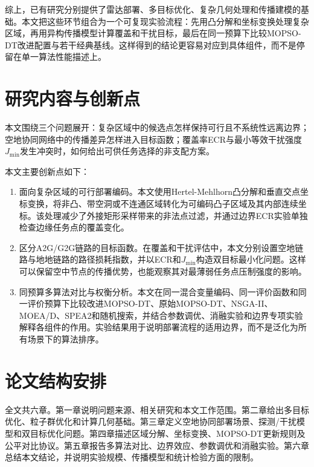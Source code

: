 综上，已有研究分别提供了雷达部署、多目标优化、复杂几何处理和传播建模的基础。本文把这些环节组合为一个可复现实验流程：先用凸分解和坐标变换处理复杂区域，再用异构传播模型计算覆盖和干扰目标，最后在同一预算下比较MOPSO-DT改进配置与若干经典基线。这样得到的结论更容易对应到具体组件，而不是停留在单一算法性能描述上。

\section{研究内容与创新点}

本文围绕三个问题展开：复杂区域中的候选点怎样保持可行且不系统性远离边界；空地协同网络中的传播差异怎样进入目标函数；覆盖率ECR与最小等效干扰强度$J_{\min}$发生冲突时，如何给出可供任务选择的非支配方案。

本文主要创新点如下：

\begin{enumerate}
    \item 面向复杂区域的可行部署编码。本文使用Hertel-Mehlhorn凸分解和垂直交点坐标变换，将非凸、带空洞或不连通区域转化为可编码凸子区域及其内部连续坐标。该处理减少了外接矩形采样带来的非法点过滤，并通过边界ECR实验单独检查边缘任务点的覆盖变化。
    \item 区分A2G/G2G链路的目标函数。在覆盖和干扰评估中，本文分别设置空地链路与地地链路的路径损耗指数，并以ECR和$J_{\min}$构造双目标最小化问题。这样可以保留空中节点的传播优势，也能观察其对最薄弱任务点压制强度的影响。
    \item 同预算多算法对比与权衡分析。本文在同一混合变量编码、同一评价函数和同一评价预算下比较改进MOPSO-DT、原始MOPSO-DT、NSGA-II、MOEA/D、SPEA2和随机搜索，并结合参数调优、消融实验和边界专项实验解释各组件的作用。实验结果用于说明部署流程的适用边界，而不是泛化为所有场景下的算法排序。
\end{enumerate}

\section{论文结构安排}

全文共六章。第一章说明问题来源、相关研究和本文工作范围。第二章给出多目标优化、粒子群优化和计算几何基础。第三章定义空地协同部署场景、探测/干扰模型和双目标优化问题。第四章描述区域分解、坐标变换、MOPSO-DT更新规则及公平对比协议。第五章报告多算法对比、边界效应、参数调优和消融实验。第六章总结本文结论，并说明实验规模、传播模型和统计检验方面的限制。
